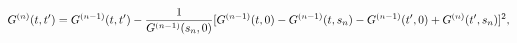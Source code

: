 \begin{equation}
G^{(n)}(t,t')= G^{(n-1)}(t,t')-{1\over G^{(n-1)}(s_n,0)} [G^{(n-1)}(t,0)-G^{(n-1)}(t,s_n) 
-G^{(n-1)}(t',0)+ G^{(n)}(t',s_n)]^2, 
\end{equation}

